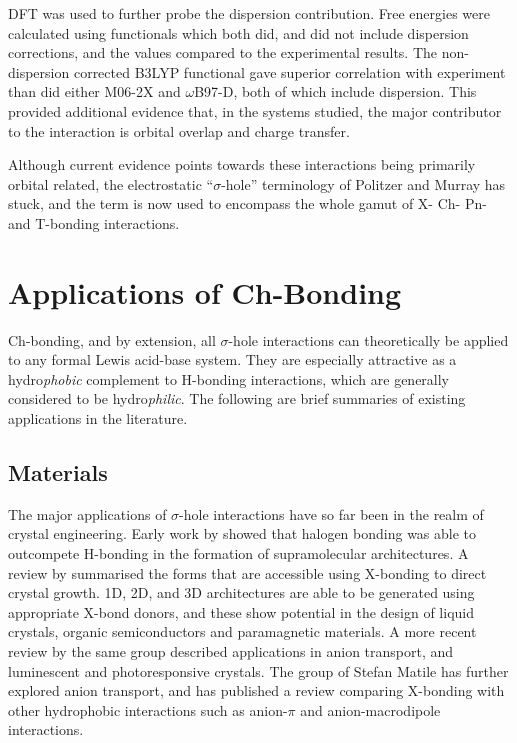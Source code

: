 \begin{refsection}
DFT was used to further probe the dispersion contribution.
Free energies were calculated using functionals which both did, and did not include dispersion corrections, and the values compared to the experimental results.
The non-dispersion corrected B3LYP functional gave superior correlation with experiment than did either M06-2X and $\omega$B97-D, both of which include dispersion.
This provided additional evidence that, in the systems studied, the major contributor to the interaction is orbital overlap and charge transfer.

Although current evidence points towards these interactions being primarily orbital related, the electrostatic ``$\sigma$-hole'' terminology of Politzer and Murray has stuck, and the term is now used to encompass the whole gamut of X- Ch- Pn- and T-bonding interactions.

\section{Applications of Ch-Bonding}
Ch-bonding, and by extension, all $\sigma$-hole interactions can theoretically be applied to any formal Lewis acid-base system.
They are especially attractive as a hydro\emph{phobic} complement to H-bonding interactions, which are generally considered to be hydro\emph{philic}.
The following are brief summaries of existing applications in the literature.

\subsection{Materials}
The major applications of $\sigma$-hole interactions have so far been in the realm of crystal engineering.
Early work by \citeauthor{Corradi2000} showed that halogen bonding was able to outcompete H-bonding in the formation of supramolecular architectures.\autocite{Corradi2000}
A review by \citeauthor{Metrangolo2008} summarised the forms that are accessible using X-bonding to direct crystal growth.\autocite{Metrangolo2008}
1D, 2D, and 3D architectures are able to be generated using appropriate X-bond donors, and these show potential in the design of liquid crystals, organic semiconductors and paramagnetic materials.
A more recent review by the same group described applications in anion transport, and luminescent and photoresponsive crystals.\autocite{Priimagi2013}
The group of Stefan Matile has further explored anion transport, and has published a review comparing X-bonding with other hydrophobic interactions such as anion-$\pi$ and anion-macrodipole interactions.\autocite{VargasJentzsch2013}


\end{refsection}
